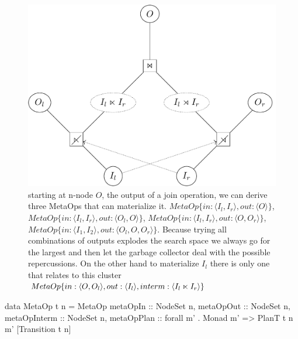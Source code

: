 \begin{figure}[p]
\centering
\includegraphics[width=.9\linewidth]{./imgs/example_metaop.pdf}
\caption{\label{fig:example_metaop}starting at n-node \(O\), the output
  of a join operation, we can derive three MetaOps that can
  materialize it.
  \(MetaOp\{in: \langle I_l, I_r \rangle, out: \langle O \rangle \}\),
  \(MetaOp\{in: \langle I_l, I_r \rangle, out: \langle O_l, O \rangle
  \}\),
  \(MetaOp\{in: \langle I_l, I_r \rangle, out: \langle O, O_r \rangle
  \}\),
  \(MetaOp\{in: \langle I_1, I_2 \rangle, out: \langle O_l, O, O_r
  \rangle \}\). Because trying all combinations of outputs explodes
  the search space we always go for the largest and then let the
  garbage collector deal with the possible repercussions. On the other
  hand to materialize \(I_l\) there is only one  that
  relates to this cluster
  \(MetaOp\{in:\langle O, O_l \rangle, out: \langle I_l \rangle,
  interm: \langle I_l \ltimes I_r \rangle \}\)}
\end{figure}

\begin{code}
\begin{haskellcode}
data MetaOp t n = MetaOp {
  metaOpIn     :: NodeSet n,
  metaOpOut    :: NodeSet n,
  metaOpInterm :: NodeSet n,
  metaOpPlan   :: forall m' . Monad m' => PlanT t n m' [Transition t n]
  }
\end{haskellcode}
  \caption{\label{lst:metaop_def}A  refers to input,
    output, and intermediate n-nodes that are involved in the set of
    operations it abstracts. Furthermore, it contains a computation
    that registers and returns the transitions involved in the
    .}
\end{code}


